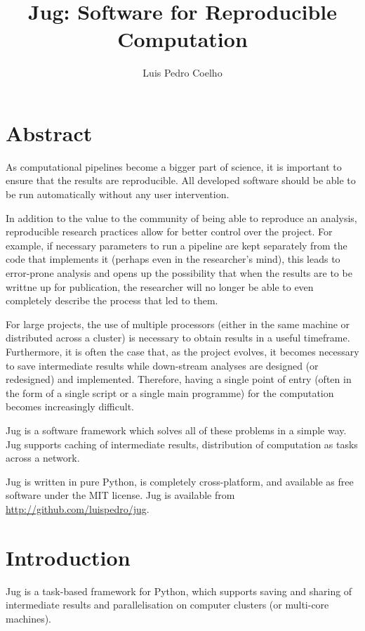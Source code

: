 \documentclass{article}
\title{Jug: Software for Reproducible Computation}
\author{Luis Pedro Coelho}
\begin{document}
\maketitle

\section*{Abstract}
As computational pipelines become a bigger part of science, it is important to
ensure that the results are reproducible. All developed software should be able
to be run automatically without any user intervention.

In addition to the value to the community of being able to reproduce an
analysis, reproducible research practices allow for better control over the
project. For example, if necessary parameters to run a pipeline are kept
separately from the code that implements it (perhaps even in the researcher's
mind), this leads to error-prone analysis and opens up the possibility that
when the results are to be writtne up for publication, the researcher will no
longer be able to even completely describe the process that led to them.

For large projects, the use of multiple processors (either in the same machine
or distributed across a cluster) is necessary to obtain results in a useful
timeframe. Furthermore, it is often the case that, as the project evolves, it
becomes necessary to save intermediate results while down-stream analyses are
designed (or redesigned) and implemented. Therefore, having a single point of
entry (often in the form of a single script or a single main programme) for the
computation becomes increasingly difficult.

Jug is a software framework which solves all of these problems in a
simple way. Jug supports caching of intermediate results, distribution of
computation as tasks across a network.

Jug is written in pure Python, is completely cross-platform, and available as
free software under the MIT license. Jug is available from
\url{http://github.com/luispedro/jug}.
\bigskip
\bigskip

\section{Introduction}
Jug is a task-based framework for Python, which supports saving and sharing of
intermediate results and parallelisation on computer clusters (or multi-core
machines).
\end{document}
